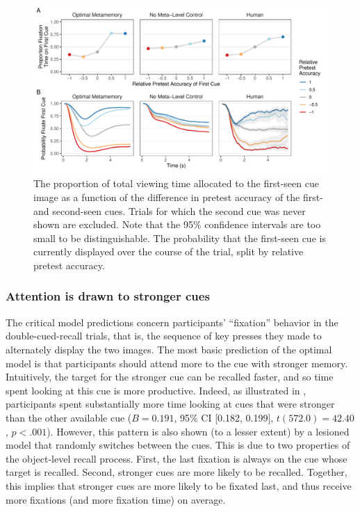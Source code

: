 \begin{figure}[t!]
  \centering
  \includegraphics[scale=.65]{figs/memory/exp2/overall_timecourse.pdf}
  \caption{
     The proportion of total viewing time allocated to the first-seen cue image as a function of the difference in pretest accuracy of the first- and second-seen cues. Trials for which the second cue was never shown are excluded. Note that the 95\% confidence intervals are too small to be distinguishable.
     The probability that the first-seen cue is currently displayed over the course of the trial, split by relative pretest accuracy.
  \label{fig:timecourse}
  }
\end{figure}

\subsubsection{Attention is drawn to stronger cues}

The critical model predictions concern participants' ``fixation'' behavior in the double-cued-recall trials, that is, the sequence of key presses they made to alternately display the two images. The most basic prediction of the optimal model is that participants should attend more to the cue with stronger memory. Intuitively, the target for the stronger cue can be recalled faster, and so time spent looking at this cue is more productive. Indeed, as illustrated in , participants spent substantially more time looking at cues that were stronger than the other available cue ($B = 0.191$, 95\% CI [0.182, 0.199], $t(572.0)=42.40$, $p < .001$). However, this pattern is also shown (to a lesser extent) by a lesioned model that randomly switches between the cues. This is due to two properties of the object-level recall process. First, the last fixation is always on the cue whose target is recalled. Second, stronger cues are more likely to be recalled. Together, this implies that stronger cues are more likely to be fixated last, and thus receive more fixations (and more fixation time) on average.


